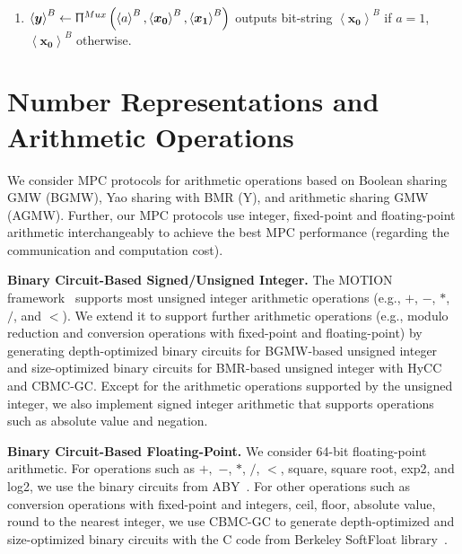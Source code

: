 \begin{enumerate}
      \item $\left\langle \boldsymbol{y}\right\rangle ^B \gets  \Uppi^{Mux}\left(\left\langle a\right\rangle^B, \left\langle \boldsymbol{x_0}\right\rangle^B ,\left\langle \boldsymbol{x_1}\right\rangle^B  \right) $ outputs bit-string $\left\langle \boldsymbol{x_0}\right\rangle^B $ if $a=1$, $\left\langle \boldsymbol{x_0}\right\rangle^B $ otherwise.

\end{enumerate}

\section{Number Representations and Arithmetic Operations}
\label{sec:NumberRepresentationsandArithmeticOperations}
We consider MPC protocols for arithmetic operations based on Boolean sharing GMW (BGMW), Yao sharing with BMR (Y), and arithmetic sharing GMW (AGMW).
Further, our MPC protocols use integer, fixed-point and floating-point arithmetic interchangeably to achieve the best MPC performance (regarding the communication and computation cost).

\textbf{Binary Circuit-Based Signed/Unsigned Integer.}
The MOTION framework~\cite{braun2022motion} supports most unsigned integer arithmetic operations (e.g., $+$, $-$, $*$, $/$, and $<$). We extend it to support further arithmetic operations (e.g., modulo reduction and conversion operations with fixed-point and floating-point) by generating depth-optimized binary circuits for BGMW-based unsigned integer and size-optimized binary circuits for BMR-based unsigned integer with HyCC and CBMC-GC.
Except for the arithmetic operations supported by the unsigned integer, we also implement signed integer arithmetic that supports operations such as absolute value and negation.

\textbf{Binary Circuit-Based Floating-Point.}
We consider 64-bit floating-point arithmetic. For operations such as $+,$ $-$, $*$, $/$, $<$, square, square root, exp2, and log2, we use the binary circuits from ABY~\cite{demmler2015aby}. For other operations such as conversion operations with fixed-point and integers, ceil, floor, absolute value, round to the nearest integer, we use CBMC-GC to generate depth-optimized and size-optimized binary circuits with the C code from Berkeley SoftFloat library~\cite{BerkelySoftFloat}.

